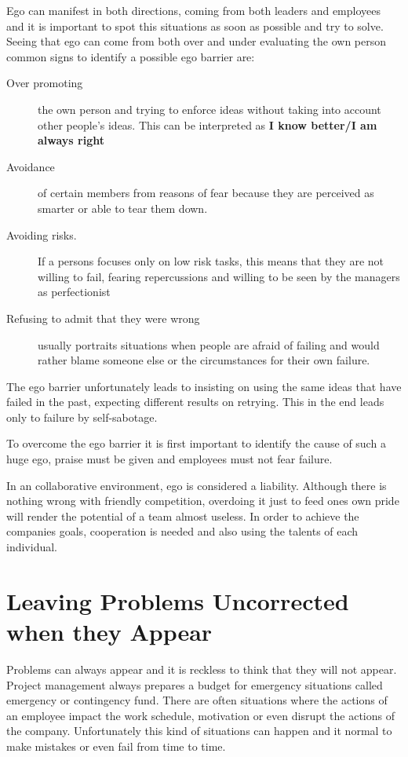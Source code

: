 Ego can manifest in both directions, coming from both leaders and employees and it is important to spot this situations as soon as possible and try to solve. Seeing that ego can come from both over and under evaluating the own person common signs to identify a possible ego barrier are:
\begin{description}
\item [Over promoting] the own person and trying to enforce ideas without taking into account other people's ideas. This can be interpreted as \textbf{I know better/I am always right}
\item [Avoidance] of certain members from reasons of fear because they are perceived as smarter or able to tear them down.
\item [Avoiding risks.] If a persons focuses only on low risk tasks, this means that they are not willing to fail, fearing repercussions and willing to be seen by the managers as perfectionist
\item [Refusing to admit that they were wrong] usually portraits situations when people are afraid of failing and would rather blame someone else or the circumstances for their own failure.
\end{description}

The ego barrier unfortunately leads to insisting on using the same ideas that have failed in the past, expecting different results on retrying. This in the end leads only to failure by self-sabotage.

To overcome the ego barrier it is first important to identify the cause of such a huge ego, praise must be given and employees must not fear failure.

In an collaborative environment, ego is considered a liability. Although there is nothing wrong with friendly competition, overdoing it just to feed ones own pride will render the potential of a team almost useless. In order  to achieve the companies goals, cooperation is needed and also using the talents of each individual. 

\section{Leaving Problems Uncorrected when they Appear}
\label{sec:uncorrected}
Problems can always appear and it is reckless to think that they will not appear. Project management always prepares a budget for emergency situations called  emergency or contingency fund.
There are often situations where the actions of an employee impact the work schedule, motivation or even disrupt the actions of the company. Unfortunately this kind of situations can happen and it normal to make mistakes or even fail from time to time. 

